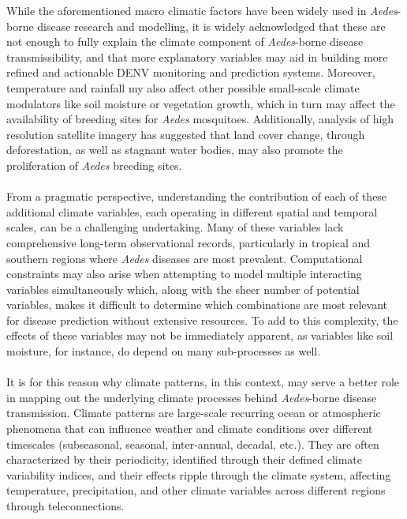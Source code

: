 \documentclass[10pt,twocolumn]{wlscirep}
\begin{document}
While the aforementioned macro climatic factors have been widely used in \textit{Aedes}-borne disease research and modelling\cite{caminade_2017, liu-helmersson_2014, mordecai_2017, wesolowski_2015}, it is widely acknowledged that these are not enough to fully explain the climate component of \textit{Aedes}-borne disease transmissibility, and that more explanatory variables may aid in building more refined and actionable DENV monitoring and prediction systems\cite{erraguntla_2021, lee_2017, yavarinejad_2021, sriklin_2021}. Moreover, temperature and rainfall my also affect other possible small-scale climate modulators like soil moisture or vegetation growth, which in turn may affect the availability of breeding sites for \textit{Aedes} mosquitoes. Additionally, analysis of high resolution satellite imagery has suggested that land cover change, through deforestation, as well as stagnant water bodies, may also promote the proliferation of \textit{Aedes} breeding sites\cite{ali_2025}.
\\
\\
From a pragmatic perspective, understanding the contribution of each of these additional climate variables, each operating in different spatial and temporal scales, can be a challenging undertaking. Many of these variables lack comprehensive long-term observational records, particularly in tropical and southern regions where \textit{Aedes} diseases are most prevalent\cite{shaw_2024, senroy_2018}. Computational constraints may also arise when attempting to model multiple interacting variables simultaneously which, along with the sheer number of potential variables, makes it difficult to determine which combinations are most relevant for disease prediction without extensive resources. To add to this complexity, the effects of these variables may not be immediately apparent, as variables like soil moisture, for instance, do depend on many sub-processes as well\cite{peng_2023}.
\\
\\
It is for this reason why climate patterns, in this context, may serve a better role in mapping out the underlying climate processes behind \textit{Aedes}-borne disease transmission. Climate patterns are large-scale recurring ocean or atmospheric phenomena that can influence weather and climate conditions over different timescales (subseasonal, seasonal, inter-annual, decadal, etc.). They are often characterized by their periodicity, identified through their defined climate variability indices, and their effects ripple through the climate system, affecting temperature, precipitation, and other climate variables across different regions through teleconnections\cite{lubbecke_2018}.
\end{document}
